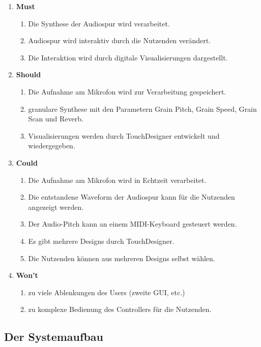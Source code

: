 \documentclass[12pt]{scrartcl}%
\theoremstyle{nonumberplain}
\begin{document}
\begin{enumerate}[]
\item \textbf{Must}
  \begin{enumerate}[-]
  \item Die Synthese der Audiospur wird verarbeitet.
  \item Audiospur wird interaktiv durch die Nutzenden verändert.
  \item Die Interaktion wird durch digitale Visualisierungen dargestellt.
  \end{enumerate}
\item \textbf{Should}
  \begin{enumerate}[-]
  \item Die Aufnahme am Mikrofon wird zur Verarbeitung gespeichert.
  \item granulare Synthese mit den Parametern Grain Pitch, Grain Speed, Grain Scan und Reverb.
  \item Visualisierungen werden durch TouchDesigner entwickelt und wiedergegeben.
  \end{enumerate}
\item \textbf{Could}
  \begin{enumerate}[-]
  \item Die Aufnahme am Mikrofon wird in Echtzeit verarbeitet.
  \item Die entstandene Waveform der Audiospur kann für die Nutzenden angezeigt werden.
  \item Der Audio-Pitch kann an einem MIDI-Keyboard gesteuert werden.
  \item Es gibt mehrere Designs durch TouchDesigner.
  \item Die Nutzenden können aus mehreren Designs selbst wählen.
  \end{enumerate}
\item \textbf{Won't}
  \begin{enumerate}[-]
  \item zu viele Ablenkungen des Users (zweite GUI, etc.)
  \item zu komplexe Bedienung des Controllers für die Nutzenden.
  \end{enumerate}
\end{enumerate}

\subsection{Der Systemaufbau}
\end{document}
